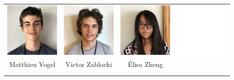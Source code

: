 \begin{center}
\begin{tabular}{cccc}
\includegraphics[angle=270,origin=c, width=27mm]{eleves/Vogel Matthieu.JPG} &
\includegraphics[angle=270,origin=c, width=27mm]{eleves/Zablocki Victor.JPG} &
\includegraphics[angle=270,origin=c, width=27mm]{eleves/Zheng Elisa.JPG} &
\includegraphics[angle=270,origin=c, width=27mm]{vide.JPG} \\
Matthieu Vogel & Victor Zablocki & Élisa Zheng & \\ \\ \\ 

\end{tabular}
\end{center}